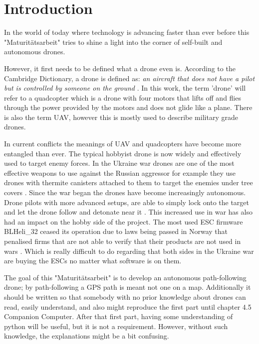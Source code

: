 \documentclass[svgnames]{article}
\begin{document}
\maketitle
\tableofcontents
\pagebreak

	\section{Introduction}
	
	In the world of today where technology is advancing faster than ever before this "Maturitätsarbeit" tries to shine a light into the corner of self-built and autonomous drones.
	
	However, it first needs to be defined what a drone even is. According to the Cambridge Dictionary, a drone is defined as: \textit{an aircraft that does not have a pilot but is controlled by someone on the ground} \cite{cambridgedrone}. In this work, the term 'drone' will refer to a quadcopter which is a drone with four motors that lifts off and flies through the power provided by the motors and does not glide like a plane. There is also the term \gls{UAV}, however this is mostly used to describe military grade drones.

	In current conflicts the meanings of \gls{UAV} and quadcopters have become more entangled than ever. The typical hobbyist drone is now widely and effectively used to target enemy forces. In the Ukraine war drones are one of the most effective weapons to use against the Russian aggressor for example they use drones with thermite canisters attached to them to target the enemies under tree covers \cite{thermitedrones}. Since the war began the drones have become increasingly autonomous. Drone pilots with more advanced setups, are able to simply lock onto the target and let the drone follow and detonate near it \cite{nytimesaidrones}. This increased use in war has also had an impact on the hobby side of the project. The most used \gls{ESC} firmware BLHeli\_32 ceased its operation due to laws being passed in Norway that penalised firms that are not able to verify that their products are not used in wars \cite{blhelidead}. Which is really difficult to do regarding that both sides in the Ukraine war are buying the \glspl{ESC} no matter what software is on them.  
	
	The goal of this "Maturitätsarbeit" is to develop an autonomous path-following drone; by path-following a \gls{GPS} path is meant not one on a map. Additionally it should be written so that somebody with no prior knowledge about drones can read, easily understand, and also might reproduce the first part until chapter 4.5 Companion Computer. After that first part, having some understanding of python will be useful, but it is not a requirement. However, without such knowledge, the explanations might be a bit confusing.
	
\end{document}
